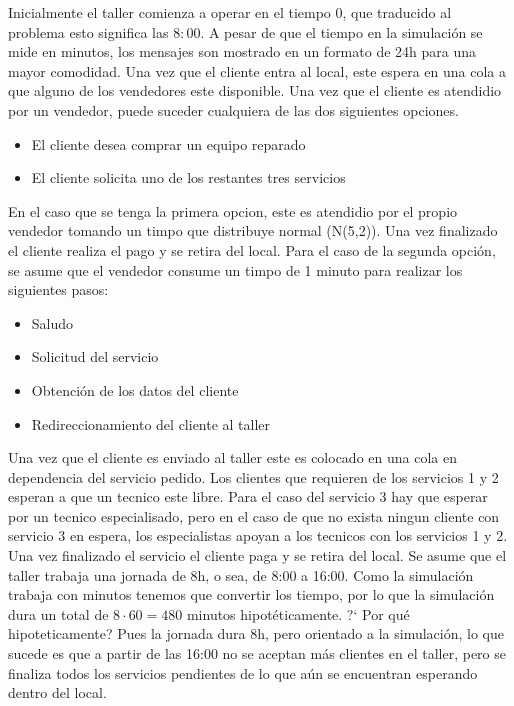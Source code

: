 \documentclass[12pt]{article}
\begin{document}
Inicialmente el taller comienza a operar en el tiempo 0, que traducido al problema esto significa las $8:00$. A pesar de que el tiempo en la simulaci\'on se mide en minutos, los mensajes son mostrado en un formato de 24h para una mayor comodidad. Una vez que el cliente entra al local, este espera en una cola a que alguno de los vendedores este disponible. Una vez que el cliente es atendidio por un vendedor, puede suceder cualquiera de las dos siguientes opciones.

\begin{itemize}
        \item El cliente desea comprar un equipo reparado
        \item El cliente solicita uno de los restantes tres servicios

\end{itemize}

En el caso que se tenga la primera opcion, este es atendidio por el propio vendedor tomando un timpo que distribuye normal (N(5,2)). Una vez finalizado el cliente realiza el pago y se retira del local.
Para el caso de la segunda opci\'on, se asume que el vendedor consume un timpo de 1 minuto para realizar los siguientes pasos:

\begin{itemize}
        \item Saludo
        \item Solicitud del servicio
        \item Obtenci\'on de los datos del cliente
        \item Redireccionamiento del cliente al taller
\end{itemize}
Una vez que el cliente es enviado al taller este es colocado en una cola en dependencia del servicio pedido. Los clientes que requieren de los servicios 1 y 2 esperan a que un tecnico este libre. Para el caso del servicio 3 hay que esperar por un tecnico especialisado, pero en el caso de que no exista ningun cliente con servicio 3 en espera, los especialistas apoyan a los tecnicos con los servicios 1 y 2. Una vez finalizado el servicio el cliente paga y se retira del local.
Se asume que el taller trabaja una jornada de 8h, o sea, de 8:00 a 16:00. Como la simulaci\'on trabaja con minutos tenemos que convertir los tiempo, por lo que la simulaci\'on dura un total de $8\cdot60=480$ minutos hipot\'eticamente. 
?` Por qu\'e hipoteticamente? Pues la jornada dura 8h, pero orientado a la simulaci\'on, lo que sucede es que a partir de las 16:00 no se aceptan m\'as clientes en el taller, pero se finaliza todos los servicios pendientes de lo que a\'un se encuentran esperando dentro del local.
\end{document}
